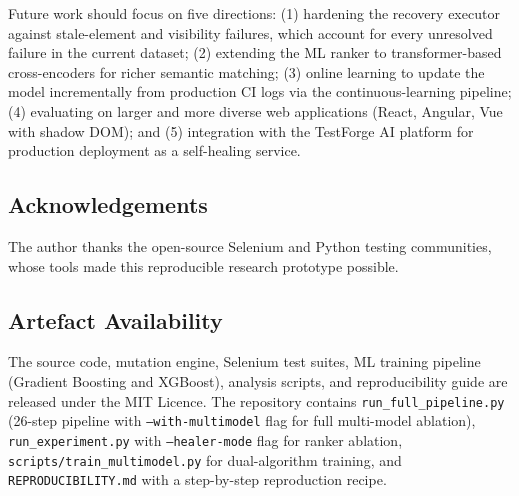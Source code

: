 \documentclass[12pt]{article}
\begin{document}
Future work should focus on five directions: (1) hardening the recovery executor against stale-element and visibility failures, which account for every unresolved failure in the current dataset; (2) extending the ML ranker to transformer-based cross-encoders for richer semantic matching; (3) online learning to update the model incrementally from production CI logs via the continuous-learning pipeline; (4) evaluating on larger and more diverse web applications (React, Angular, Vue with shadow DOM); and (5) integration with the TestForge AI platform for production deployment as a self-healing service.

\subsection*{Acknowledgements}

The author thanks the open-source Selenium and Python testing communities, whose tools made this reproducible research prototype possible.

\subsection*{Artefact Availability}

The source code, mutation engine, Selenium test suites, ML training pipeline (Gradient Boosting and XGBoost), analysis scripts, and reproducibility guide are released under the MIT Licence. The repository contains \texttt{run\_full\_pipeline.py} (26-step pipeline with \texttt{--with-multimodel} flag for full multi-model ablation), \texttt{run\_experiment.py} with \texttt{--healer-mode} flag for ranker ablation, \texttt{scripts/train\_multimodel.py} for dual-algorithm training, and \texttt{REPRODUCIBILITY.md} with a step-by-step reproduction recipe.
\end{document}

